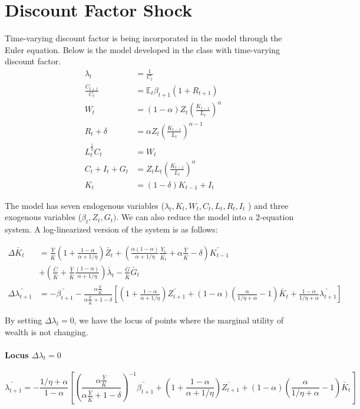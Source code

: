 \documentclass[11pt]{amsart}
\begin{document}
\section{Discount Factor Shock}
Time-varying discount factor is being incorporated in the model through the Euler equation. Below is the model developed in the class with time-varying discount factor. 
\begin{align*}
\lambda_t &= \frac{1}{C_t} \\
\frac{C_{t+1}}{C_t} &=  \mathbb{E}_t \beta_{t+1} (1+ R_{t+1})\\
W_t &= (1-\alpha) Z_t \left( \frac{K_{t-1}}{L_t} \right)^\alpha \\
R_t + \delta & = \alpha Z_t \left( \frac{K_{t-1}}{L_t} \right)^{\alpha-1} \\
L_t^{\frac{1}{\eta}} C_t &= W_t \\
C_t + I_t + G_t &= Z_t L_t \left(\frac{K_{t-1}}{L_t} \right)^\alpha \\
K_t &= (1-\delta) K_{t-1} + I_t
\end{align*}

The model has seven endogenous variables ($\lambda_t, K_t, W_t, C_t, L_t, R_t, I_t$ ) and three exogenous variables ($\beta_t, Z_t, G_t)$. We can also reduce the model into a 2-equation system. A log-linearized version of the system is as follows:

\begin{align*}
\Delta \check{K_t} &= \frac{\bar{Y}}{\bar{K}} \left( 1 + \frac{1-\alpha}{\alpha + 1/\eta} \right) \check{Z_t} + \left( \frac{\alpha (1-\alpha )}{\alpha + 1/\eta}  \frac{\bar{Y_t}}{\bar{K_t}}  + \alpha \frac{\bar{Y}}{\bar{K}} - \delta  \right) \check{K_{t-1}}  \\
&+ \left( \frac{\bar{C}}{\bar{K}} + \frac{\bar{Y}}{\bar{K}} \frac{(1-\alpha)}{\alpha + 1/\eta}\right) \check{\lambda_t} - \frac{\bar{G}}{\bar{K}}\check{G_t} \\
\Delta \check{\lambda_{t+1}}  &=  - \check{\beta_{t+1}} - \frac{\alpha \frac{\bar{Y}}{\bar{K}}}{\alpha \frac{\bar{Y}}{\bar{K}} + 1 - \delta} \left[   \left( 1 + \frac{1-\alpha}{\alpha + 1/\eta} \right) \check{Z_{t+1}} + (1-\alpha) \left( \frac{\alpha}{1/\eta + \alpha} -1 \right) \check{K_t} + \frac{1-\alpha}{1/\eta + \alpha} \check{\lambda_{t+1}}  \right]
\end{align*}

By setting $\Delta \lambda_t = 0$, we have the locus of points where the marginal utility of wealth is not changing.
\paragraph{\bf Locus $\Delta \lambda_t = 0$} 
\begin{equation*}
\check{\lambda_{t+1}} = -  \frac{1/\eta + \alpha}{1-\alpha} \left[  \left( \frac{\alpha \frac{\bar{Y}}{\bar{K}}}{\alpha \frac{\bar{Y}}{\bar{K}} + 1 - \delta} \right)^{-1} \check{\beta_{t+1}} +  \left( 1 + \frac{1-\alpha}{\alpha + 1/\eta} \right) \check{Z_{t+1}} + (1-\alpha) \left( \frac{\alpha}{1/\eta + \alpha} -1 \right) \check{K_t} \right] 
\end{equation*}
\end{document}
